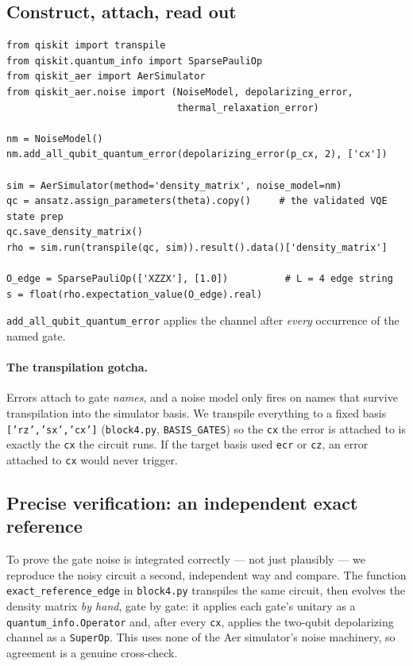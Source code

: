\documentclass[11pt]{article}
\begin{document}
\subsection{Construct, attach, read out}

\begin{verbatim}
from qiskit import transpile
from qiskit.quantum_info import SparsePauliOp
from qiskit_aer import AerSimulator
from qiskit_aer.noise import (NoiseModel, depolarizing_error,
                              thermal_relaxation_error)

nm = NoiseModel()
nm.add_all_qubit_quantum_error(depolarizing_error(p_cx, 2), ['cx'])

sim = AerSimulator(method='density_matrix', noise_model=nm)
qc = ansatz.assign_parameters(theta).copy()     # the validated VQE state prep
qc.save_density_matrix()
rho = sim.run(transpile(qc, sim)).result().data()['density_matrix']

O_edge = SparsePauliOp(['XZZX'], [1.0])          # L = 4 edge string
s = float(rho.expectation_value(O_edge).real)
\end{verbatim}
\texttt{add\_all\_qubit\_quantum\_error} applies the channel after \emph{every} occurrence of the named gate.

\paragraph{The transpilation gotcha.} Errors attach to gate \emph{names}, and a noise model only fires on names that survive transpilation into the simulator basis. We transpile everything to a fixed basis \texttt{['rz','sx','cx']} (\texttt{block4.py}, \texttt{BASIS\_GATES}) so the \texttt{cx} the error is attached to is exactly the \texttt{cx} the circuit runs. If the target basis used \texttt{ecr} or \texttt{cz}, an error attached to \texttt{cx} would never trigger.

\subsection{Precise verification: an independent exact reference}

To prove the gate noise is integrated correctly --- not just plausibly --- we reproduce the noisy circuit a second, independent way and compare. The function \texttt{exact\_reference\_edge} in \texttt{block4.py} transpiles the same circuit, then evolves the density matrix \emph{by hand}, gate by gate: it applies each gate's unitary as a \texttt{quantum\_info.Operator} and, after every \texttt{cx}, applies the two-qubit depolarizing channel as a \texttt{SuperOp}. This uses none of the Aer simulator's noise machinery, so agreement is a genuine cross-check.
\end{document}
